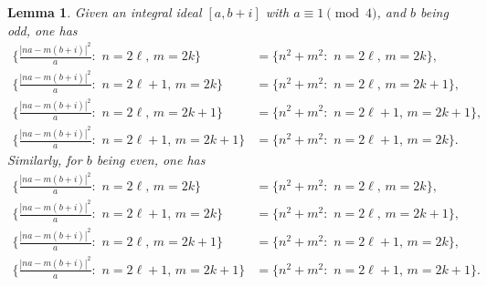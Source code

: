 \documentclass[11pt, reqno]{amsart}
\theoremstyle{plain}
\newtheorem{lemma}[theorem]{Lemma}
\theoremstyle{definition}
\numberwithin{equation}{section}
\begin{document}
\begin{lemma}\label{lemparity}
    Given an integral ideal $[a,b+i]$ with $a\equiv1\pmod{4}$, and $b$ being odd, one has 
        \begin{align*}
            \{\frac{|na-m(b+i)|^{2}}{a}:\,\, n=2\ell,\,m=2k\}&=\{n^{2}+m^{2}:\,\, n=2\ell,\,m=2k\},\\
             \{\frac{|na-m(b+i)|^{2}}{a}:\,\, n=2\ell+1,\,m=2k\}&=\{n^{2}+m^{2}:\,\, n=2\ell,\,m=2k+1\},\\
              \{\frac{|na-m(b+i)|^{2}}{a}:\,\, n=2\ell,\,m=2k+1\}&=\{n^{2}+m^{2}:\,\, n=2\ell+1,\,m=2k+1\},\\
               \{\frac{|na-m(b+i)|^{2}}{a}:\,\, n=2\ell+1,\,m=2k+1\}&=\{n^{2}+m^{2}:\,\, n=2\ell+1,\,m=2k\}.
        \end{align*}
Similarly, for $b$ being even, one has
 \begin{align*}
            \{\frac{|na-m(b+i)|^{2}}{a}:\,\, n=2\ell,\,m=2k\}&=\{n^{2}+m^{2}:\,\, n=2\ell,\,m=2k\},\\
             \{\frac{|na-m(b+i)|^{2}}{a}:\,\, n=2\ell+1,\,m=2k\}&=\{n^{2}+m^{2}:\,\, n=2\ell,\,m=2k+1\},\\
              \{\frac{|na-m(b+i)|^{2}}{a}:\,\, n=2\ell,\,m=2k+1\}&=\{n^{2}+m^{2}:\,\, n=2\ell+1,\,m=2k\},\\
               \{\frac{|na-m(b+i)|^{2}}{a}:\,\, n=2\ell+1,\,m=2k+1\}&=\{n^{2}+m^{2}:\,\, n=2\ell+1,\,m=2k+1\}.
        \end{align*}
\end{lemma}
\end{document}
